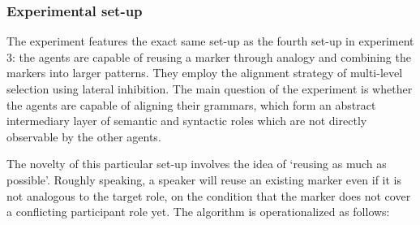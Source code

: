 \subsubsection{Experimental set-up}
 The experiment features the exact same set-up as the fourth set-up in experiment 3: the agents are capable of reusing a marker through analogy and combining the markers into larger patterns. They employ the alignment strategy of multi-level selection using lateral inhibition. The main question of the experiment is whether the agents are capable of aligning their grammars, which form an abstract intermediary layer of semantic and syntactic roles which are not directly observable by the other agents.

The novelty of this particular set-up involves the idea of `reusing as much as possible'. Roughly speaking, a speaker will reuse an existing marker even if it is not analogous to the target role, on the condition that the marker does not cover a conflicting participant role yet. The algorithm is operationalized as follows:

